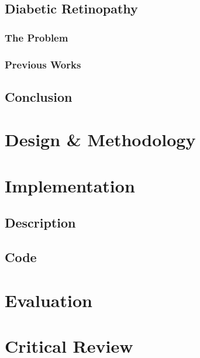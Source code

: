 \documentclass[a4paper,12pt]{article}
\begin{document}
\paragraph{}
\subsection{Diabetic Retinopathy}
\subsubsection{The Problem}
\paragraph{}
\subsubsection{Previous Works}
\paragraph{}
\subsection{Conclusion}
\paragraph{}
\newpage
\section{Design \& Methodology}

\newpage
\section{Implementation}
\subsection{Description}
\subsection{Code}
\newpage
\section{Evaluation}

\newpage
\section{Critical Review}
\end{document}
